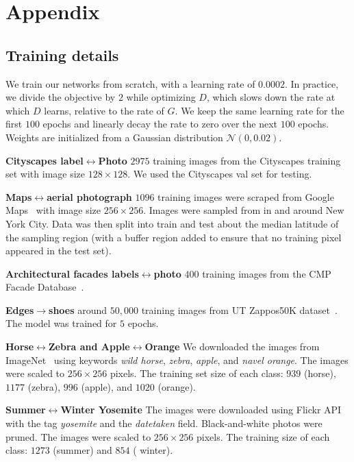 \section{Appendix}


\subsection{Training details}
We train our networks from scratch,  with a learning rate of $0.0002$. In practice, we divide the objective by $2$ while optimizing $D$, which slows down the rate at which $D$ learns, relative to the rate of $G$. We keep the same learning rate for the first $100$ epochs and linearly decay the rate to zero over the next $100$ epochs. Weights are initialized from a Gaussian distribution $\mathcal{N}(0, 0.02)$.

{\bf Cityscapes label$\leftrightarrow$Photo} $2975$ training images from the Cityscapes training set \cite{Cordts2016Cityscapes} with image size $128 \times 128$. We used the Cityscapes val set for testing.

{\bf Maps$\leftrightarrow$aerial photograph} $1096$ training images were scraped from Google Maps~\cite{isola2016image} with image size $256 \times 256$. Images were sampled from in and around New York City. Data was then split into train and test about the median latitude of the sampling region (with a buffer region added to ensure that no training pixel appeared in the test set).


{\bf Architectural facades labels$\leftrightarrow$photo} $400$ training images from the CMP Facade Database~\cite{Tylecek13}.

{\bf Edges$\rightarrow$shoes} around $50,000$ training images from UT Zappos50K dataset~\cite{yu2014fine}. The model was trained for $5$ epochs. 

{\bf Horse$\leftrightarrow$Zebra and Apple$\leftrightarrow$Orange} We downloaded the images from ImageNet~\cite{deng2009imagenet} using keywords \textit{wild horse}, \textit{zebra}, \textit{apple}, and \textit{navel orange}. The images were scaled to $256 \times 256$ pixels. The training set size of each class: $939$ (horse), $1177$ (zebra), $996$ (apple), and $1020$ (orange).

{\bf Summer$\leftrightarrow$Winter Yosemite} The images were downloaded using Flickr API with the tag \textit{yosemite} and the \textit{datetaken} field. Black-and-white photos were pruned. The images were scaled to $256 \times 256$ pixels. The training size of each class: $1273$ (summer) and $854$ ( winter).

